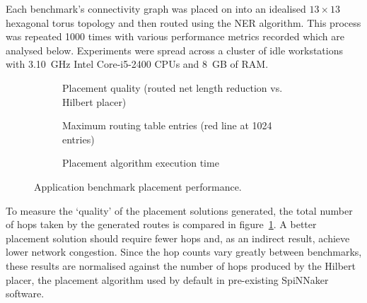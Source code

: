 				Each benchmark's connectivity graph was placed on into an idealised $13
				\times 13$ hexagonal torus topology and then routed using the NER
				algorithm. This process was repeated \num{1000} times with various
				performance metrics recorded which are analysed below. Experiments were
				spread across a cluster of idle workstations with 3.10~GHz Intel
				Core-i5-2400 CPUs and 8~GB of RAM.
			
				\begin{figure}
					\center
					\begin{subfigure}{\linewidth}
						\center
						
						\caption{Placement quality (routed net length reduction vs. Hilbert
						placer)}
						\label{fig:application-benchmarks-quality}
					\end{subfigure}
					
					\vspace*{1em}
					
					\begin{subfigure}{\linewidth}
						\center
						
						\caption{Maximum routing table entries (red line at \num{1024} entries)}
						\label{fig:application-benchmarks-tables}
					\end{subfigure}
					
					\vspace*{1em}
					
					\begin{subfigure}{\linewidth}
						\center
						
						\caption{Placement algorithm execution time}
						\label{fig:application-benchmarks-runtime}
					\end{subfigure}
					
					\caption{Application benchmark placement performance.}
					\label{fig:application-benchmarks}
				\end{figure}
				
				To measure the `quality' of the placement solutions generated, the
				total number of hops taken by the generated routes is compared in
				figure~\ref{fig:application-benchmarks-quality}. A better placement
				solution should require fewer hops and, as an indirect result, achieve
				lower network congestion.  Since the hop counts vary greatly between
				benchmarks, these results are normalised against the number of hops
				produced by the Hilbert placer, the placement algorithm used by default
				in pre-existing SpiNNaker software.
				
